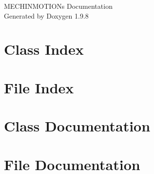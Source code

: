 \documentclass[twoside]{book}
\newcommand{\+}{\discretionary{\mbox{\scriptsize$\hookleftarrow$}}{}{}}
\newcommand{\clearemptydoublepage}{%
    \newpage{\pagestyle{empty}\cleardoublepage}%
  }
\begin{document}
  \raggedbottom
    \hypersetup{pageanchor=false,
                bookmarksnumbered=true,
                pdfencoding=unicode
               }
  \begin{titlepage}
  \vspace*{7cm}
  \begin{center}%
  {\Large MECHINMOTION\textquotesingle{}s Documentation}\\
  \vspace*{1cm}
  {\large Generated by Doxygen 1.9.8}\\
  \end{center}
  \end{titlepage}
  \clearemptydoublepage
  \tableofcontents
  \clearemptydoublepage
  \hypersetup{pageanchor=true}

\chapter{Class Index}

\chapter{File Index}

\chapter{Class Documentation}



\chapter{File Documentation}




  \backmatter
  \newpage
  \clearemptydoublepage
  \printindex
\end{document}

